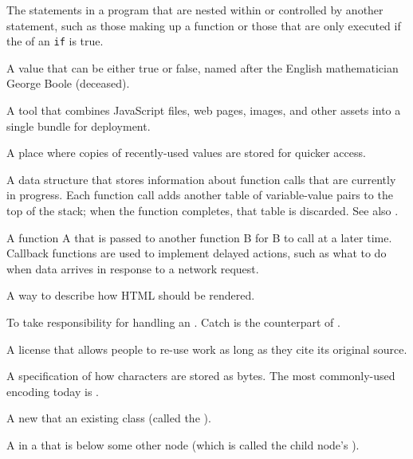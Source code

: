 \begin{description}
The statements in a program that are nested within or controlled by another statement,
such as those making up a function or those that are only executed
if the  of an \texttt{if} is true.

A value that can be either true or false,
named after the English mathematician George Boole (deceased).

A tool that combines JavaScript files, web pages, images, and other assets
into a single bundle for deployment.

A place where copies of recently-used values are stored for quicker access.

A data structure that stores information about function calls that are
currently in progress. Each function call adds another table of
variable-value pairs to the top of the stack; when the function completes,
that table is discarded. See also .

A function A that is passed to another function B for B to call at a later
time. Callback functions are used to implement delayed actions, such as what
to do when data arrives in response to a network request.

A way to describe how HTML should be rendered.

To take responsibility for handling an .
Catch is the counterpart of .

A license that allows people to re-use work as long as they cite its
original source.

A specification of how characters are stored as bytes. The most commonly-used
encoding today is .

A new  that  an existing class (called
the ).

A  in a  that is below some other node (which is
called the child node's ).


\end{description}
